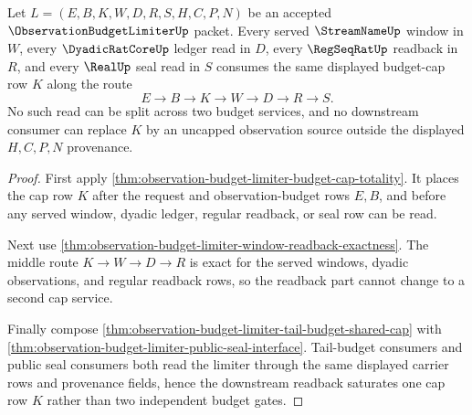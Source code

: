 \begin{theorem}
\label{thm:observation-budget-limiter-budget-readback-saturation}
Let $L=(E,B,K,W,D,R,S,H,C,P,N)$ be an accepted $\ObservationBudgetLimiterUp$ packet. Every served $\StreamNameUp$ window in $W$, every $\DyadicRatCoreUp$ ledger read in $D$, every $\RegSeqRatUp$ readback in $R$, and every $\RealUp$ seal read in $S$ consumes the same displayed budget-cap row $K$ along the route
$$
E \to B \to K \to W \to D \to R \to S.
$$
No such read can be split across two budget services, and no downstream consumer can replace $K$ by an uncapped observation source outside the displayed $H,C,P,N$ provenance.
\end{theorem}
\begin{proof}
First apply \autoref{thm:observation-budget-limiter-budget-cap-totality}. It places the cap row $K$ after the request and observation-budget rows $E,B$, and before any served window, dyadic ledger, regular readback, or seal row can be read.

Next use \autoref{thm:observation-budget-limiter-window-readback-exactness}. The middle route $K \to W \to D \to R$ is exact for the served windows, dyadic observations, and regular readback rows, so the readback part cannot change to a second cap service.

Finally compose \autoref{thm:observation-budget-limiter-tail-budget-shared-cap} with \autoref{thm:observation-budget-limiter-public-seal-interface}. Tail-budget consumers and public seal consumers both read the limiter through the same displayed carrier rows and provenance fields, hence the downstream readback saturates one cap row $K$ rather than two independent budget gates.
\end{proof}

